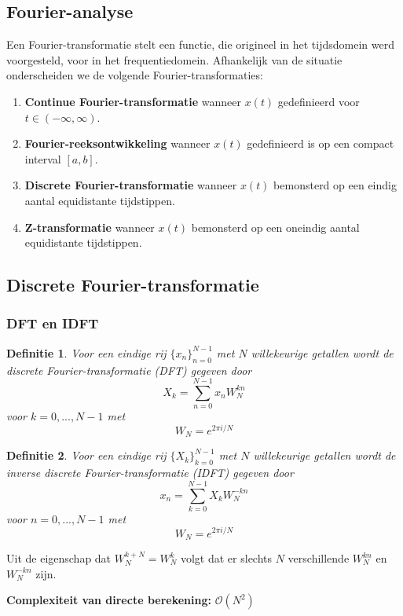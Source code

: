 \documentclass{article}
\newtheorem{mydef}{Definitie}
\begin{document}
	\subsection{Fourier-analyse}
	Een Fourier-transformatie stelt een functie, die origineel in het tijdsdomein werd voorgesteld, voor in het frequentiedomein. Afhankelijk van de situatie onderscheiden we de volgende Fourier-transformaties:
		\begin{enumerate}
			\item \textbf{Continue Fourier-transformatie} wanneer $x(t)$ gedefinieerd voor $t \in (-\infty, \infty)$.
			\item \textbf{Fourier-reeksontwikkeling} wanneer $x(t)$ gedefinieerd is op een compact interval $[a, b]$.
			\item \textbf{Discrete Fourier-transformatie} wanneer $x(t)$ bemonsterd op een eindig aantal equidistante tijdstippen.
			\item \textbf{Z-transformatie} wanneer $x(t)$ bemonsterd op een oneindig aantal equidistante tijdstippen.
		\end{enumerate}	
	
	\subsection{Discrete Fourier-transformatie}
	
	\subsubsection{DFT en IDFT}
	
	\begin{mydef}
		Voor een eindige rij $\{x_n\}_{n=0}^{N-1}$ met $N$ willekeurige getallen wordt de discrete Fourier-transformatie (DFT) gegeven door
		$$
			X_k = \sum_{n=0}^{N-1} x_n W_N^{kn}  
		$$
		voor $k=0, ... , N-1$ met
		$$
			W_N = e^{2\pi i/N}
		$$
	\end{mydef}

	\begin{mydef}
		Voor een eindige rij $\{X_k\}_{k=0}^{N-1}$ met $N$ willekeurige getallen wordt de inverse discrete Fourier-transformatie (IDFT) gegeven door
		$$
		x_n = \sum_{k=0}^{N-1} X_k W_N^{-kn}  
		$$
		voor $n=0, ... , N-1$ met
		$$
		W_N = e^{2\pi i/N}
		$$
	\end{mydef}

	Uit de eigenschap dat $W_N^{k+N} = W_N^k$ volgt dat er slechts $N$ verschillende $W_N^{kn}$ en $W_N^{-kn}$ zijn. 
	
	\textbf{Complexiteit van directe berekening:} $\mathcal{O}(N^2)$
\end{document}
